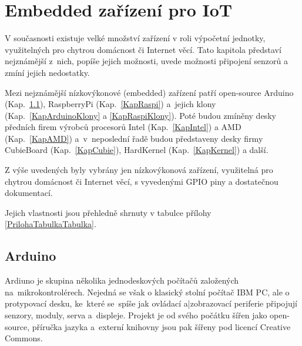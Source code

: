 \chapter{Embedded zařízení pro IoT}
\label{ChapterEmbeddedZarizeni}

V současnosti existuje velké množství zařízení v roli výpočetní jednotky, využitelných pro chytrou domácnost či Internet věcí. Tato kapitola představí nejznámější z~nich, popíše jejich možnosti, uvede možnosti připojení senzorů a zmíní jejich nedostatky. 

Mezi nejznámější nízkovýkonové (embedded) zařízení patří open-source Arduino (Kap.~\ref{KapArduino}), RaspberryPi (Kap.~\ref{KapRaspi}) a~jejich klony (Kap.~\ref{KapArduinoKlony} a \ref{KapRaspiKlony}). Poté budou zmíněny desky předních firem výrobců procesorů Intel (Kap.~\ref{KapIntel}) a AMD (Kap.~\ref{KapAMD}) a~v~neposlední řadě budou představeny desky firmy CubieBoard (Kap.~\ref{KapCubie}), HardKernel (Kap.~\ref{KapKernel}) a další. 

Z výše uvedených byly vybrány jen nízkovýkonová zařízení, využitelná pro chytrou domácnost či Internet věcí, s vyvedenými GPIO piny a dostatečnou dokumentací.

Jejich vlastnosti jsou přehledně shrnuty v tabulce přílohy \ref{PrilohaTabulkaTabulka}.


\section{Arduino}
\label{KapArduino}

Ardiuno je skupina několika jednodeskových počítačů založených na~mikrokontrolérech. Nejedná se však o klasický stolní počítač IBM PC, ale o protypovací desku, ke~které se~spíše jak ovládací a|zobrazovací periferie připojují senzory, moduly, serva a~displeje. Projekt je od svého počátku šířen jako open-source, příručka jazyka a~externí knihovny jsou pak šířeny pod licencí Creative Commons.
	
